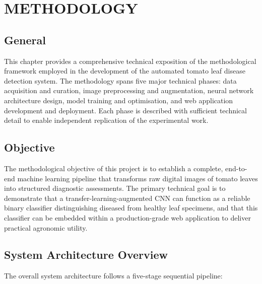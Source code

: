 \documentclass[12pt,a4paper]{report}
\begin{document}
\chapter{METHODOLOGY}

\section{General}

This chapter provides a comprehensive technical exposition of the methodological framework employed in the development of the automated tomato leaf disease detection system. The methodology spans five major technical phases: data acquisition and curation, image preprocessing and augmentation, neural network architecture design, model training and optimisation, and web application development and deployment. Each phase is described with sufficient technical detail to enable independent replication of the experimental work.

\section{Objective}

The methodological objective of this project is to establish a complete, end-to-end machine learning pipeline that transforms raw digital images of tomato leaves into structured diagnostic assessments. The primary technical goal is to demonstrate that a transfer-learning-augmented CNN can function as a reliable binary classifier distinguishing diseased from healthy leaf specimens, and that this classifier can be embedded within a production-grade web application to deliver practical agronomic utility.

\section{System Architecture Overview}

The overall system architecture follows a five-stage sequential pipeline:
\end{document}
